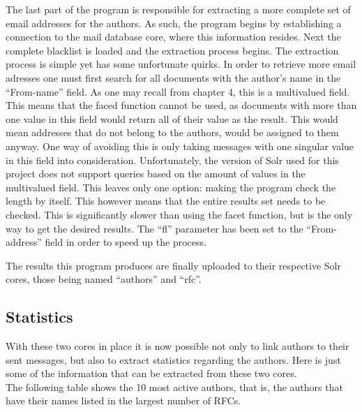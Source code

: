 \documentclass[a4paper,english]{report}
\begin{document}
The last part of the program is responsible for extracting a more complete set of email addresses for the authors. As such, the program begins by establishing a connection to the mail database core, where this information resides. Next the complete blacklist is loaded and the extraction process begins. 
The extraction process is simple yet has some unfortunate quirks. In order to retrieve more email adresses one must first search for all documents with the author's name in the “From-name” field. As one may recall from chapter 4, this is a multivalued field. This means that the faced function cannot be used, as documents with more than one value in this field would return all of their value as the result. This would mean addresses that do not belong to the authors, would be assigned to them anyway. One way of avoiding this is only taking messages with one singular value in this field into consideration. Unfortunately, the version of Solr used for this project does not support queries based on the amount of values in the multivalued field. This leaves only one option: making the program check the length by itself. This however means that the entire results set needs to be checked. This is significantly slower than using the facet function, but is the only way to get the desired results. The “fl” parameter has been set to the “From-address” field in order to speed up the process.



The results this program produces are finally uploaded to their respective Solr cores, those being named “authors” and “rfc”.
\subsection{Statistics}


With these two cores in place it is now possible not only to link authors to their sent messages, but also to extract statistics regarding the authors. Here is just some of the information that can be extracted from these two cores.\\

The following table shows the 10 most active authors, that is, the authors that have their names listed in the largest number of RFCs.
\end{document}
